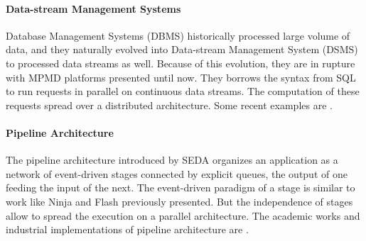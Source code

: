 
\paragraph{Data-stream Management Systems}

Database Management Systems (DBMS) historically processed large volume of data, and they naturally evolved into Data-stream Management System (DSMS) to processed data streams as well.
Because of this evolution, they are in rupture with MPMD platforms presented until now.
They borrows the syntax from SQL to run requests in parallel on continuous data streams.
The computation of these requests spread over a distributed architecture.
Some recent examples are .


\paragraph{Pipeline Architecture}

The pipeline architecture introduced by SEDA \cite{Welsh2001} organizes an application as a network of event-driven stages connected by explicit queues, the output of one feeding the input of the next.
The event-driven paradigm of a stage is similar to work like Ninja \cite{Gribble2001} and Flash \cite{Pai1999} previously presented.
But the independence of stages allow to spread the execution on a parallel architecture.
The academic works and industrial implementations of pipeline architecture are .


\separator

